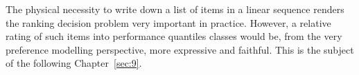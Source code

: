 \vspace{\baselineskip}
The physical necessity to write down a list of items in a linear sequence renders the ranking decision problem very important in practice. However, a relative rating of such items into performance quantiles classes would be, from the very preference modelling perspective, more expressive and faithful. This is the subject of the following Chapter~\ref{sec:9}.


%



